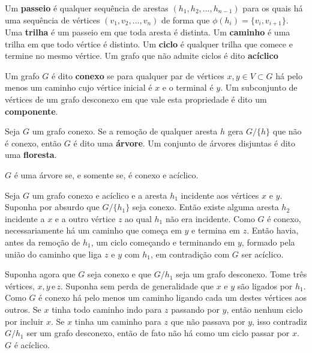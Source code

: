 \begin{defi}
Um \textbf{passeio} é qualquer sequência de arestas $(h_1, h_2, ..., h_{n-1})$ para os quais há uma sequência de vértices $(v_1, v_2, ..., v_n)$ de forma que $\phi(h_i) = \{v_i, v_{i+1}\}$. Uma \textbf{trilha} é um passeio em que toda aresta é distinta. Um \textbf{caminho} é uma trilha em que todo vértice é distinto. Um \textbf{ciclo} é qualquer trilha que comece e termine no mesmo vértice. Um grafo que não admite ciclos é dito \textbf{acíclico}
\end{defi}

\begin{defi}
Um grafo $G$ é dito \textbf{conexo} se para qualquer par de vértices $x, y \in V \subset G$ há pelo menos um caminho cujo vértice inicial é $x$ e o terminal é $y$. Um subconjunto de vértices de um grafo desconexo em que vale esta propriedade é dito um \textbf{componente}.
\end{defi}


\begin{defi}
Seja $G$ um grafo conexo. Se a remoção de qualquer aresta $h$ gera $G / \{h\}$ que não é conexo, então $G$ é dito uma \textbf{árvore}. Um conjunto de árvores disjuntas é dito uma \textbf{floresta}.
\end{defi}

\begin{teo}
$G$ é uma árvore se, e somente se, é conexo e acíclico.
\end{teo}

\begin{prova}
Seja $G$ um grafo conexo e acíclico e a aresta $h_1$ incidente aos vértices $x$ e $y$. Suponha por absurdo que $G / \{h_1\}$ seja conexo. Então existe alguma aresta $h_2$ incidente a $x$ e a outro vértice $z$ ao qual $h_1$ não era incidente. Como $G$ é conexo, necessariamente há um caminho que começa em $y$ e termina em $z$. Então havia, antes da remoção de $h_1$, um ciclo começando e terminando em $y$, formado pela união do caminho que liga $z$ e $y$ com $h_1$, em contradição com $G$ ser acíclico.

Suponha agora que $G$ seja conexo e que $G / h_1$ seja um grafo desconexo. Tome três vértices, $x, y \,\text{e}\, z$. Suponha sem perda de generalidade que $x$ e $y$ são ligados por $h_1$. Como $G$ é conexo há pelo menos um caminho ligando cada um destes vértices aos outros. Se $x$ tinha todo caminho indo para $z$ passando por $y$, então nenhum ciclo por incluir $x$. Se $x$ tinha um caminho para $z$ que não passava por $y$, isso contradiz $G / h_1$ ser um grafo desconexo, então de fato não há como um ciclo passar por $x$. $G$ é acíclico. \blacksquare


\end{prova}

